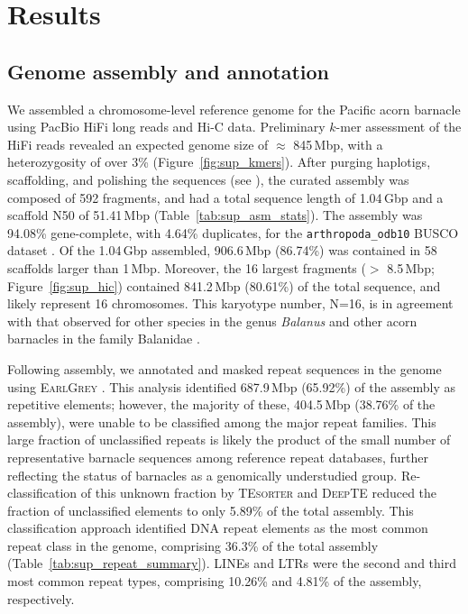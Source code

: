 \section*{Results}

\subsection*{Genome assembly and annotation}

We assembled a chromosome-level reference genome for the Pacific acorn barnacle
using PacBio HiFi long reads and Hi-C data.
Preliminary $k$-mer assessment of the HiFi reads revealed an expected genome
size of $\approx$ 845\,Mbp, with a heterozygosity of over 3\% (Figure~\ref{fig:sup_kmers}).
After purging haplotigs, scaffolding, and polishing the sequences (see
), the curated assembly was composed of 592 fragments,
and had a total sequence length of 1.04\,Gbp and a scaffold N50 of 51.41\,Mbp
(Table~\ref{tab:sup_asm_stats}).
The assembly was 94.08\% gene-complete, with 4.64\% duplicates, for the
\texttt{arthropoda\_odb10} \textsc{BUSCO} dataset
\citep{simao_busco_2015,manni_busco_2021,tegenfeldt_orthodb_2025}.
Of the 1.04\,Gbp assembled, 906.6\,Mbp (86.74\%) was contained in 58 scaffolds
larger than 1\,Mbp.
Moreover, the 16 largest fragments ($>$ 8.5\,Mbp; Figure~\ref{fig:sup_hic})
contained 841.2\,Mbp (80.61\%) of the total sequence, and likely represent 16 chromosomes.
This karyotype number, N=16, is in agreement with that observed for other species in the
genus \textit{Balanus} \citep{austin_chromosome_1958} and other acorn barnacles in the
family Balanidae \citep{han_new_2024}.
\vspace{0.1cm}

Following assembly, we annotated and masked repeat sequences in the genome using
\textsc{EarlGrey} \citep{baril_earl_2024}.
This analysis identified 687.9\,Mbp (65.92\%) of the assembly as repetitive elements;
however, the majority of these, 404.5\,Mbp (38.76\% of the assembly), were unable to
be classified among the major repeat families.
This large fraction of unclassified repeats is likely the product of the small number
of representative barnacle sequences among reference repeat databases, further reflecting
the status of barnacles as a genomically understudied group.
Re-classification of this unknown fraction by \textsc{TEsorter}
\citep{zhang_tesorter_2022} and \textsc{DeepTE} \citep{yan_deepte_2020} reduced the
fraction of unclassified elements to only 5.89\% of the total assembly.
This classification approach identified DNA repeat elements as the most common repeat
class in the \bgla{} genome, comprising 36.3\% of the total assembly
(Table~\ref{tab:sup_repeat_summary}).
LINEs and LTRs were the second and third most common repeat types, comprising 10.26\%
and 4.81\% of the assembly, respectively.
\vspace{0.1cm}

